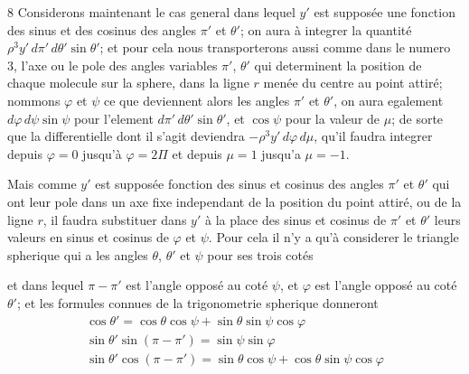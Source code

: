 \documentclass[11pt,a4paper]{article}
\begin{document}
8 Considerons maintenant le cas general dans lequel $y'$ est supposée une fonction des sinus et des cosinus des angles $\pi'$ et $\theta'$; on aura à integrer la quantité $\rho^3 y'\,d\pi'\,d\theta' \sin\theta'$; et pour cela nous transporterons aussi comme dans le numero 3, l'axe ou le pole des angles variables $\pi'$, $\theta'$ qui determinent la position de chaque molecule sur la sphere, dans la ligne $r$ menée du centre au point attiré; nommons $\varphi$ et $\psi$ ce que deviennent alors les angles $\pi'$ et $\theta'$, on aura egalement $d\varphi\,d\psi \sin\psi$ pour  l'element $d\pi'\,d\theta' \sin\theta'$, et \struck{\ill{}} $\cos\psi$ pour la valeur de $\mu$; de sorte que la differentielle dont il s'agit deviendra $-\rho^3 y'\,d\varphi\,d\mu$, qu'il faudra integrer depuis $\varphi = 0$ jusqu'à $\varphi = 2\Pi$ et depuis $\mu = 1$ jusqu'a $\mu = -1$.

Mais comme $y'$ est supposée fonction des sinus et cosinus des angles $\pi'$ et $\theta'$ qui ont leur pole dans un axe fixe independant de la position du point attiré, ou de la ligne $r$, il faudra substituer dans $y'$ à la place des sinus et cosinus de $\pi'$ et $\theta'$ leurs valeurs en sinus et cosinus de $\varphi$ et $\psi$. Pour cela il n'y a qu'à considerer le triangle spherique qui a les angles $\theta$, $\theta'$ et $\psi$ pour ses trois cotés


et dans lequel $\pi - \pi'$ est l'angle opposé au coté $\psi$, et $\varphi$ est l'angle opposé au coté $\theta'$; et les formules connues de la trigonometrie spherique donneront
\[ \begin{array}{l} \cos\theta' = \cos\theta\cos\psi + \sin\theta\sin\psi\cos\varphi \\ \sin\theta'\sin(\pi - \pi') = \sin\psi\sin\varphi \\ \sin\theta'\cos(\pi - \pi') = \sin\theta\cos\psi + \cos\theta\sin\psi\cos\varphi \end{array} \]
\end{document}
